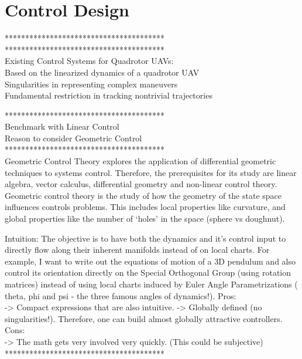 \chapter{Control Design} \label{ch:control}
***************************************\\

***************************************\\
Existing Control Systems for Quadrotor UAVs:\\
Based on the linearized dynamics of a quadrotor UAV \\
Singularities in representing complex maneuvers \\
Fundamental restriction in tracking nontrivial trajectories

***************************************\\

Benchmark with Linear Control\\

Reason to consider Geometric Control\\ 
***************************************\\
Geometric Control Theory explores the application of differential geometric techniques to systems control. 
Therefore, the prerequisites for its study are linear algebra, vector calculus, differential geometry and non-linear control theory.
Geometric control theory is the study of how the geometry of the state space influences controls problems. This includes local properties like curvature, and global properties like the number of `holes’ in the space (sphere vs doughnut).

Intuition: The objective is to have both the dynamics and it's control input to directly flow along their inherent manifolds instead of on local charts. For example, I want to write out the equations of motion of a 3D pendulum and also control its orientation directly on the Special Orthogonal Group (using rotation matrices)  instead of using local charts induced by Euler Angle Parametrizations ( theta, phi and psi - the three famous angles of dynamics!).
Pros:\\
->  Compact expressions that are also intuitive.
-> Globally defined (no singularities!). Therefore, one can build almost globally attractive controllers.\\
Cons:\\
-> The math gets very involved very quickly. (This could be subjective)
***************************************\\


